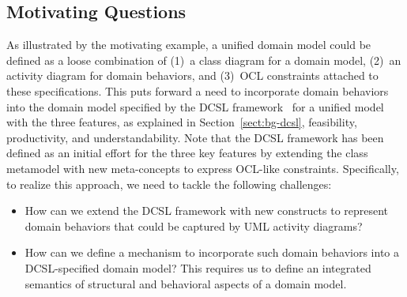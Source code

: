 %
\subsection{Motivating Questions}

As illustrated by the motivating example, a unified domain model could be defined as a loose combination of (1)~a class diagram for a domain model, (2)~an activity diagram for domain behaviors, and (3)~OCL constraints attached to these specifications. This puts forward a need to incorporate domain behaviors into the domain model specified by the DCSL framework~\cite{le_domain_2018} for a unified model with the three features, as explained in Section~\ref{sect:bg-dcsl}, feasibility, productivity, and understandability. Note that the DCSL framework has been defined as an initial effort for the three key features by extending the class metamodel with new meta-concepts to express OCL-like constraints.
Specifically, to realize this approach, we need to tackle the following challenges:

\begin{itemize}
    \item How can we extend the DCSL framework with new constructs to represent domain behaviors that could be captured by UML activity diagrams?
    \item How can we define a mechanism to incorporate such domain behaviors into a DCSL-specified domain model? This requires us to define an integrated semantics of structural and behavioral aspects of a domain model.
\end{itemize}


